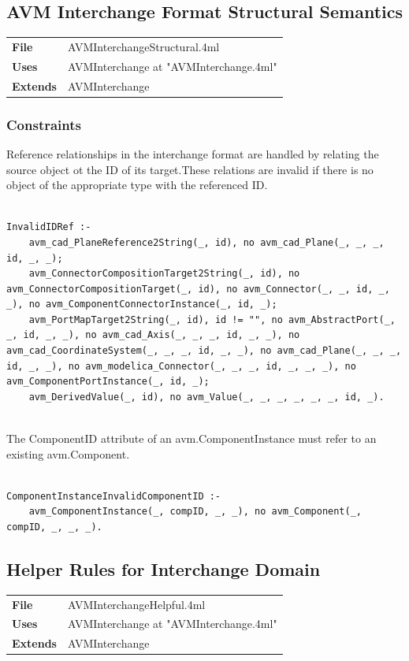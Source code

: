 \subsection{AVM Interchange Format Structural Semantics}
\begin{tabular}{ l l }
\textbf{File} & AVMInterchangeStructural.4ml \\
\textbf{Uses} & AVMInterchange at "AVMInterchange.4ml" \\
\textbf{Extends} &  AVMInterchange \\
\end{tabular}


\subsubsection{Constraints}


Reference relationships in the interchange format are handled by relating the source object ot the ID of its target.These relations are invalid if there is no object of the appropriate type with the referenced ID.
\begin{lstlisting}

InvalidIDRef :-
    avm_cad_PlaneReference2String(_, id), no avm_cad_Plane(_, _, _, id, _, _);
    avm_ConnectorCompositionTarget2String(_, id), no avm_ConnectorCompositionTarget(_, id), no avm_Connector(_, _, id, _, _), no avm_ComponentConnectorInstance(_, id, _);
    avm_PortMapTarget2String(_, id), id != "", no avm_AbstractPort(_, _, id, _, _), no avm_cad_Axis(_, _, _, id, _, _), no avm_cad_CoordinateSystem(_, _, _, id, _, _), no avm_cad_Plane(_, _, _, id, _, _), no avm_modelica_Connector(_, _, _, id, _, _, _), no avm_ComponentPortInstance(_, id, _);
    avm_DerivedValue(_, id), no avm_Value(_, _, _, _, _, _, id, _).


\end{lstlisting}

The ComponentID attribute of an avm.ComponentInstance must refer to an existing avm.Component.
\begin{lstlisting}

ComponentInstanceInvalidComponentID :-
    avm_ComponentInstance(_, compID, _, _), no avm_Component(_, compID, _, _, _).

\end{lstlisting}


\subsection{Helper Rules for Interchange Domain}
\begin{tabular}{ l l }
\textbf{File} & AVMInterchangeHelpful.4ml \\
\textbf{Uses} & AVMInterchange at "AVMInterchange.4ml" \\
\textbf{Extends} &  AVMInterchange \\
\end{tabular}


